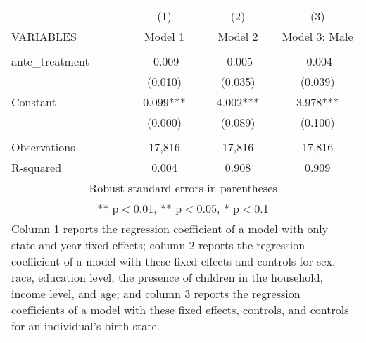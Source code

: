 \begin{tabular}{lccc}
\hline
 & (1) & (2) & (3) \\
VARIABLES & Model 1 & Model 2 & Model 3: Male \\ \hline
 &  &  &  \\
ante\_treatment & -0.009 & -0.005 & -0.004 \\
 & (0.010) & (0.035) & (0.039) \\
Constant & 0.099*** & 4.002*** & 3.978*** \\
 & (0.000) & (0.089) & (0.100) \\
 &  &  &  \\
Observations & 17,816 & 17,816 & 17,816 \\
 R-squared & 0.004 & 0.908 & 0.909 \\ \hline
\multicolumn{4}{c}{\small Robust standard errors in parentheses} \\
\multicolumn{4}{c}{\small *** p$<$0.01, ** p$<$0.05, * p$<$0.1} \\
\multicolumn{4}{p{0.8\linewidth}}{\small Column 1 reports the
regression coefficient of a model with only state and year fixed effects; column 2 reports the
regression coefficient of a model with these fixed effects and controls for sex, race, education
level, the presence of children in the household, income level, and age; and column 3 reports
the regression coefficients of a model with these fixed effects, controls, and controls for an
individual’s birth state.} \\
\end{tabular}
